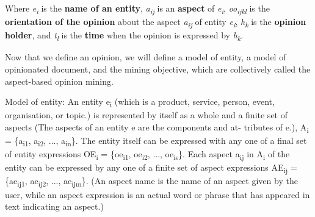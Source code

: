 Where \emph{e\textsubscript{i}} is the \textbf{name of an entity}, \emph{a\textsubscript{ij}} is an \textbf{aspect} of \emph{e\textsubscript{i}}, \emph{oo\textsubscript{ijkl}} is the \textbf{orientation of the opinion} about the aspect \emph{a\textsubscript{ij}} of entity \emph{e\textsubscript{i}}, \emph{h\textsubscript{k}} is the \textbf{opinion holder}, and \emph{t\textsubscript{l}} is the \textbf{time} when the opinion is expressed by \emph{h\textsubscript{k}}.


Now that we define an opinion, we will define a model of entity, a model of opinionated document, and the mining objective, which are collectively called the aspect-based opinion mining.

Model of entity: An entity e\textsubscript{i} (which is a product, service, person, event, organisation, or topic.) is represented by itself as a whole and a finite set of aspects (The aspects of an entity e are the components and at- tributes of e.), A\textsubscript{i} = \{a\textsubscript{i1}, a\textsubscript{i2}, ..., a\textsubscript{in}\}. The entity itself can be expressed with any one of a final set of entity expressions OE\textsubscript{i} = \{oe\textsubscript{i1}, oe\textsubscript{i2}, ..., oe\textsubscript{is}\}. Each aspect a\textsubscript{ij} in A\textsubscript{i} of the entity can be expressed by any one of a finite set of aspect expressions AE\textsubscript{ij} = \{ae\textsubscript{ij1}, ae\textsubscript{ij2}, ..., ae\textsubscript{ijm}\}. (An aspect name is the name of an aspect given by the user, while an aspect expression is an actual word or phrase that has appeared in text indicating an aspect.)


